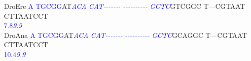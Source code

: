 \documentclass[11pt,twoside,reqno,a4paper]{article}
\begin{document}
{DroEre	\textcolor{Blue}{A}	\textcolor{Blue}{T}\textcolor{Blue}{G}\textcolor{Blue}{C}\textcolor{Blue}{G}\textcolor{Blue}{G}AT\textit{\textcolor{Blue}{A}}\textit{\textcolor{Blue}{C}}\textit{\textcolor{Blue}{A}}	\textit{\textcolor{Blue}{C}}\textit{\textcolor{Blue}{A}}\textit{\textcolor{Blue}{T}}\textit{\textcolor{Blue}{-}}\textit{\textcolor{Blue}{-}}\textit{\textcolor{Blue}{-}}\textit{\textcolor{Blue}{-}}\textit{\textcolor{Blue}{-}}\textit{\textcolor{Blue}{-}}\textit{\textcolor{Blue}{-}}	\textit{\textcolor{Blue}{-}}\textit{\textcolor{Blue}{-}}\textit{\textcolor{Blue}{-}}\textit{\textcolor{Blue}{-}}\textit{\textcolor{Blue}{-}}\textit{\textcolor{Blue}{-}}\textit{\textcolor{Blue}{-}}\textit{\textcolor{Blue}{-}}\textit{\textcolor{Blue}{-}}\textit{\textcolor{Blue}{-}}	\textit{\textcolor{Blue}{G}}\textit{\textcolor{Blue}{C}}\textit{\textcolor{Blue}{T}}\textit{\textcolor{Blue}{C}}GTCGGC	T---CGTAAT	CTTAATCCT\\
\hspace*{7\charwidth}\hspace*{0\charwidth}\textcolor{Blue}{7.8}\hspace*{1\charwidth}\hspace*{5\charwidth}\textit{\textcolor{Blue}{9.9}}\hspace*{1\charwidth}\hspace*{1\charwidth}\hspace*{1\charwidth}\hspace*{1\charwidth}\hspace*{1\charwidth}\\
DroAna	\textcolor{Blue}{A}	\textcolor{Blue}{T}\textcolor{Blue}{G}\textcolor{Blue}{C}\textcolor{Blue}{G}\textcolor{Blue}{G}AT\textit{\textcolor{Blue}{A}}\textit{\textcolor{Blue}{C}}\textit{\textcolor{Blue}{A}}	\textit{\textcolor{Blue}{C}}\textit{\textcolor{Blue}{A}}\textit{\textcolor{Blue}{T}}\textit{\textcolor{Blue}{-}}\textit{\textcolor{Blue}{-}}\textit{\textcolor{Blue}{-}}\textit{\textcolor{Blue}{-}}\textit{\textcolor{Blue}{-}}\textit{\textcolor{Blue}{-}}\textit{\textcolor{Blue}{-}}	\textit{\textcolor{Blue}{-}}\textit{\textcolor{Blue}{-}}\textit{\textcolor{Blue}{-}}\textit{\textcolor{Blue}{-}}\textit{\textcolor{Blue}{-}}\textit{\textcolor{Blue}{-}}\textit{\textcolor{Blue}{-}}\textit{\textcolor{Blue}{-}}\textit{\textcolor{Blue}{-}}\textit{\textcolor{Blue}{-}}	\textit{\textcolor{Blue}{G}}\textit{\textcolor{Blue}{C}}\textit{\textcolor{Blue}{T}}\textit{\textcolor{Blue}{C}}GCAGGC	T---CGTAAT	CTTAATCCT\\
\hspace*{7\charwidth}\hspace*{0\charwidth}\textcolor{Blue}{10.4}\hspace*{1\charwidth}\hspace*{4\charwidth}\textit{\textcolor{Blue}{9.9}}\hspace*{1\charwidth}\hspace*{1\charwidth}\hspace*{1\charwidth}\hspace*{1\charwidth}\hspace*{1\charwidth}\\
}
\end{document}
